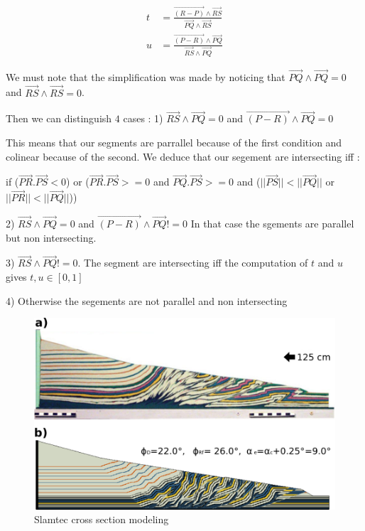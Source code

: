 \documentclass[12pt, a4paper]{memoir} %
\begin{document}
\begin{align}
	t &= \frac{\overrightarrow{(R - P)} \wedge \overrightarrow{RS}}{\overrightarrow{PQ} \wedge \overrightarrow{RS}}\\
	u &= \frac{\overrightarrow{(P - R)} \wedge \overrightarrow{PQ}}{\overrightarrow{RS} \wedge \overrightarrow{PQ}}
\end{align}

We must note that the simplification was made by noticing that $\overrightarrow{PQ} \wedge \overrightarrow{PQ} = 0$ and $\overrightarrow{RS} \wedge \overrightarrow{RS} = 0$.

Then we can distinguish $4$ cases :
1) $ \overrightarrow{RS} \wedge \overrightarrow{PQ} = 0$ and $\overrightarrow{(P - R)} \wedge \overrightarrow{PQ} = 0$

This means that our segments are parrallel because of the first condition and colinear because of the second. We deduce that our segement are intersecting 
iff :

if ($\overrightarrow{PR}.\overrightarrow{PS} < 0$) or ($\overrightarrow{PR}.\overrightarrow{PS} >= 0$ and $\overrightarrow{PQ}.\overrightarrow{PS} >= 0$ and ($||\overrightarrow{PS}|| < ||\overrightarrow{PQ}||$ or $||\overrightarrow{PR}|| < ||\overrightarrow{PQ}||$))

2)  $ \overrightarrow{RS} \wedge \overrightarrow{PQ} = 0$ and $\overrightarrow{(P - R)} \wedge \overrightarrow{PQ} != 0$
In that case the sgements are parallel but non intersecting.

3)  $ \overrightarrow{RS} \wedge \overrightarrow{PQ} != 0$.
The segment are intersecting iff the computation of $t$ and $u$ gives $t,u \in [0,1]$

4) Otherwise the segements are not parallel and non intersecting


\begin{figure}[H]
	\centering
	\includegraphics[scale=0.5]{slamtec.png}
	\caption{Slamtec cross section modeling}
\end{figure}




\end{document}
